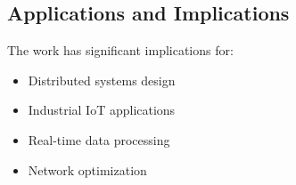 \subsection{Applications and Implications}
The work has significant implications for:
\begin{itemize}
    \item Distributed systems design
    \item Industrial IoT applications
    \item Real-time data processing
    \item Network optimization
\end{itemize} 